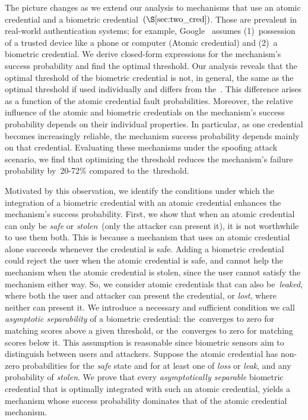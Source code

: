 \documentclass[conference,compsoc]{IEEEtran}
\begin{document}
The picture changes as we extend our analysis to mechanisms that use an atomic credential and a biometric credential~$(\S\ref{sec:two_cred})$. Those are prevalent in real-world authentication systems; for example, Google~\cite{google_passkeys_2023} assumes (1)~possession of a trusted device like a phone or computer (Atomic credential) and (2)~a biometric credential. We derive closed-form expressions for the mechanism's success probability and find the optimal threshold. Our analysis reveals that the optimal threshold of the biometric credential is not, in general, the same as the optimal threshold if used individually and differs from the~\EER. This difference arises as a function of the atomic credential fault probabilities. Moreover, the relative influence of the atomic and biometric credentials on the mechanism's success probability depends on their individual properties. In particular, as one credential becomes increasingly reliable, the mechanism success probability depends mainly on that credential. Evaluating these mechanisms under the spoofing attack scenario, we find that optimizing the threshold reduces the mechanism's failure probability by~20-72\% compared to the~\EER threshold. 

Motivated by this observation, we identify the conditions under which the integration of a biometric credential with an atomic credential enhances the mechanism's success probability. First, we show that when an atomic credential can only be \emph{safe} or \emph{stolen}~(only the attacker can present it), it is not worthwhile to use them both. This is because a mechanism that uses an atomic credential alone succeeds whenever the credential is safe. Adding a biometric credential could reject the user when the atomic credential is safe, and cannot help the mechanism when the atomic credential is stolen, since the user cannot satisfy the mechanism either way. So, we consider atomic credentials that can also be~\emph{leaked}, where both the user and attacker can present the credential, or \emph{lost}, where neither can present it. We introduce a necessary and sufficient condition we call \emph{asymptotic separability} of a biometric credential: the~\FAR converges to zero for matching scores above a given threshold, or the~\FRR converges to zero for matching scores below it. This assumption is reasonable since biometric sensors aim to distinguish between users and attackers. Suppose the atomic credential has non-zero probabilities for the \emph{safe} state and for at least one of \emph{loss} or \emph{leak}, and any probability of \emph{stolen}. We prove that every \emph{asymptotically separable} biometric credential that is optimally integrated with such an atomic credential, yields a mechanism whose success probability dominates that of the atomic credential mechanism.
\end{document}
